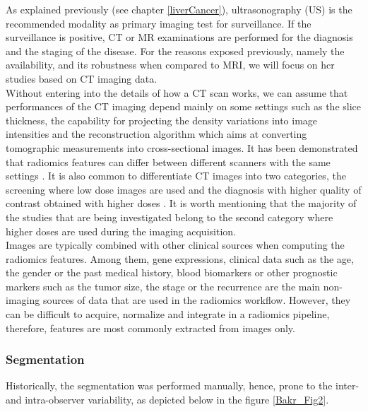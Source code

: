 As explained previously (see chapter \ref{liverCancer}), ultrasonography (US) is the recommended
modality as primary imaging test for surveillance. If the surveillance
is positive, CT or MR examinations are performed for the diagnosis and
the staging of the disease. For the reasons exposed previously, namely
the availability, and its robustness when compared to MRI, we will focus
on \ac{hcr} studies based on CT imaging data.\\
Without entering into the details of how a CT scan works, we can assume
that performances of the CT imaging depend mainly on some settings such
as the slice thickness, the capability for projecting the density
variations into image intensities and the reconstruction algorithm which
aims at converting tomographic measurements into cross-sectional images.
It has been demonstrated that radiomics features can differ between
different scanners with the same settings \cite{Berenguer2018}. 
It is also common to differentiate CT images into two
categories, the screening where low dose images are used and the
diagnosis with higher quality of contrast obtained with 
higher doses \cite{Thawani2018}. It is worth mentioning that the
majority of the studies that are being investigated belong to the second
category where higher doses are used during the imaging acquisition.\\
Images are typically combined with other clinical sources when computing
the radiomics features. Among them, gene expressions, clinical data such
as the age, the gender or the past medical history, blood biomarkers or
other prognostic markers such as the tumor size, the stage or the
recurrence are the main non-imaging sources of data that are used in the
radiomics workflow. However, they can be difficult to acquire, normalize
and integrate in a radiomics pipeline, therefore, features are most
commonly extracted from images only.

\subsubsection{Segmentation}\label{segmentation}

Historically, the segmentation was performed manually, hence, prone
to the inter- and intra-observer variability, as depicted below in the figure \ref{Bakr_Fig2}.

